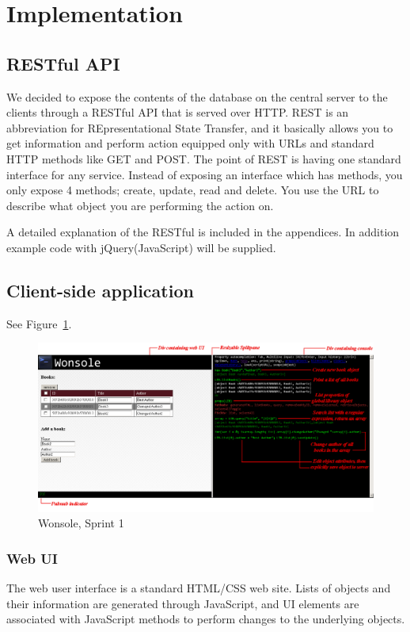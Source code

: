 \section{Implementation}

\subsection{RESTful API}
We decided to expose the contents of the database on the central server to the clients through a RESTful API that is served over HTTP. REST is an abbreviation for REpresentational State Transfer, and it basically allows you to get information and perform action equipped only with URLs and standard HTTP methods like GET and POST. The point of REST is having one standard interface for any service. Instead of exposing an interface which has methods, you only expose 4 methods; create, update, read and delete.  You use the URL to describe what object you are performing the action on.

A detailed explanation of the RESTful is included in the appendices. In addition example code with jQuery(JavaScript) will be supplied.

\subsection{Client-side application}

See Figure~\ref{figure:Wonsole-Sprint1}.

\begin{figure}
\centering
\includegraphics[width=6in]{image/Wonsole-Sprint1.png}
\caption{Wonsole, Sprint 1}
\label{figure:Wonsole-Sprint1}
\end{figure}

\subsubsection{Web UI}
The web user interface is a standard HTML/CSS web site. Lists of objects and their information are generated through JavaScript, and UI elements are associated with JavaScript methods to perform changes to the underlying objects.

